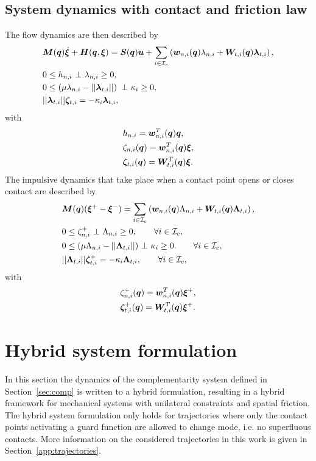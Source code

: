 \documentclass[../DC2017114Bouma.tex]{subfiles}
\begin{document}
\subsection{System dynamics with contact and friction law}
The flow dynamics are then described by
\begin{align}
&\Mb(\qb)\dot{\xib} + \Hb(\qb,\xib) = \Sb(\qb)\ub + \sum_{i\in\Ic_c}\left(\wb_{n,i}(\qb)\lambda_{n,i} + \Wb_{t,i}(\qb)\lambdab_{t,i} \right), \label{eq:ncpcontact1}\\
&0\leq h_{n,i}\ \bot\ \lambda_{n,i} \geq 0,\label{eq:ncpcontact2}\\
&0\leq \left(\mu\lambda_{n,i} - ||\lambdab_{t,i}||\right)\ \bot\ \kappa_i \geq 0,\label{eq:ncpcontact3}\\
&||\lambdab_{t,i}||\zetab_{t,i} = -\kappa_i\lambdab_{t,i},\label{eq:ncpcontact4}
\end{align}
with 
\begin{align}
&h_{n,i} = {\boldsymbol{w}}_{n,i}^T({\boldsymbol{q}}){\boldsymbol{q}},\label{eq:h}\\
&\zeta_{n,i}({\boldsymbol{q}}) = {\boldsymbol{w}}^T_{n,i}({\boldsymbol{q}}) \boldsymbol{\xi},  \label{eq:zetan}\\
&\boldsymbol{\zeta}_{t,i}({\boldsymbol{q}}) = {\boldsymbol{W}}^T_{t,i}({\boldsymbol{q}}) \boldsymbol{\xi}. \label{eq:zetab}
\end{align}
The impulsive dynamics that take place when a contact point opens or closes contact are described by
\begin{align}
&{\boldsymbol{M}}({\boldsymbol{q}})(\boldsymbol{\xi}^+ - \boldsymbol{\xi}^-) = \sum_{i\in\mathcal{I}_c}\left( {\boldsymbol{w}}_{n,i}({\boldsymbol{q}})\Lambda_{n,i} + {\boldsymbol{W}}_{t,i}({\boldsymbol{q}})\boldsymbol{\Lambda}_{t,i}\right), \label{eq:ncpimpact1}\\
&0\leq \zeta_{n,i}^+\ \bot\ \Lambda_{n,i} \geq 0, \qquad \forall i\in\mathcal{I}_c,\label{eq:ncpimpact2}\\
&0 \leq (\mu\Lambda_{n,i} - ||\boldsymbol{\Lambda}_{t,i}||)\ \bot\ \kappa_i \geq 0. \qquad \forall i\in\mathcal{I}_c,\label{eq:ncpimpact3}\\
&||\boldsymbol{\Lambda}_{t,i}||\boldsymbol{\zeta}_{t,i}^+ = -\kappa_i\boldsymbol{\Lambda}_{t,i},\qquad \forall i\in\mathcal{I}_c,\label{eq:ncpimpact4}
\end{align}
with 
\begin{align}
&\zeta^+_{n,i}({\boldsymbol{q}}) = {\boldsymbol{w}}^T_{n,i}({\boldsymbol{q}}) \boldsymbol{\xi}^+,\\
&\boldsymbol{\zeta}^+_{t,i}({\boldsymbol{q}}) = {\boldsymbol{W}}^T_{t,i}({\boldsymbol{q}}) \boldsymbol{\xi}^+.\label{eq:ncpimpactend}
\end{align}

\section{Hybrid system formulation}
In this section the dynamics of the complementarity system defined in Section~\ref{sec:comp} is written to a hybrid formulation, resulting in a hybrid framework for mechanical systems with unilateral constraints and spatial friction. The hybrid system formulation only holds for trajectories where only the contact points activating a guard function are allowed to change mode, i.e. no superfluous contacts. More information on the considered trajectories in this work is given in Section~\ref{app:trajectories}.
\end{document}
